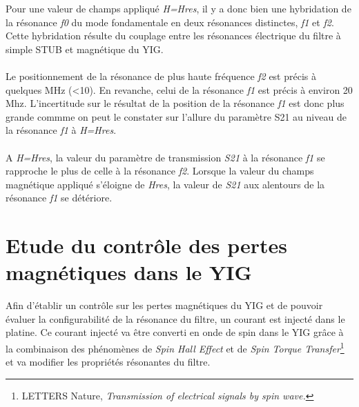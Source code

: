 \documentclass[12pt,fleqn]{book} %
\begin{document}
\noindent Pour une valeur de champs appliqué \emph{H=Hres}, il y a donc bien une hybridation de la résonance \emph{f0} du mode fondamentale en deux résonances distinctes, \emph{f1} et \emph{f2}. Cette hybridation résulte du couplage entre les résonances électrique du filtre à simple STUB et magnétique du YIG.
~\\\\ Le positionnement de la résonance de plus haute fréquence \emph{f2} est précis à quelques MHz (<10). En revanche, celui de la résonance \emph{f1} est précis à environ 20 Mhz. L'incertitude sur le résultat de la position de la résonance \emph{f1} est donc plus grande commme on peut le constater sur l'allure du paramètre S21 au niveau de la résonance \emph{f1} à \emph{H=Hres}.
~\\\\ A \emph{H=Hres}, la valeur du paramètre de transmission \emph{S21} à la résonance \emph{f1} se rapproche le plus de celle à la résonance \emph{f2}. Lorsque la valeur du champs magnétique appliqué s'éloigne de \emph{Hres}, la valeur de \emph{S21} aux alentours de la résonance \emph{f1} se détériore.
\chapter{Etude du contrôle des pertes magnétiques dans le YIG}
Afin d'établir un contrôle sur les pertes magnétiques du YIG et de pouvoir évaluer la configurabilité de la résonance du filtre, un courant est injecté dans le platine. Ce courant injecté va être converti en onde de spin dans le YIG grâce à la combinaison des phénomènes de \emph{Spin Hall Effect} et de \emph{Spin Torque Transfer}\footnote{LETTERS Nature, \emph{Transmission of electrical signals by spin wave.}} et va modifier les propriétés résonantes du filtre.
\end{document}

